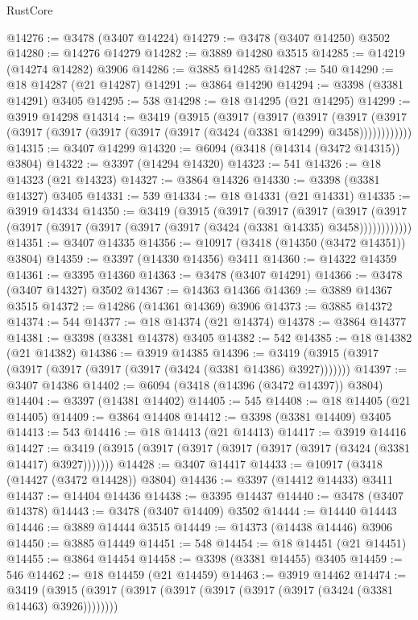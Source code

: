 \begin{lexlean}{RustCore}
\begin{coremodule}
@14276 := @3478 (@3407 @14224)
@14279 := @3478 (@3407 @14250) @3502
@14280 := @14276 @14279
@14282 := @3889 @14280 @3515
@14285 := @14219 (@14274 @14282) @3906
@14286 := @3885 @14285
@14287 := 540
@14290 := @18 @14287 (@21 @14287)
@14291 := @3864 @14290
@14294 := @3398 (@3381 @14291) @3405
@14295 := 538
@14298 := @18 @14295 (@21 @14295)
@14299 := @3919 @14298
@14314 := @3419
    (@3915
      (@3917
        (@3917
          (@3917
            (@3917 (@3917 (@3917 (@3917 (@3917 (@3917 (@3917 (@3424 (@3381 @14299) @3458))))))))))))
@14315 := @3407 @14299
@14320 := @6094 (@3418 (@14314 (@3472 @14315)) @3804)
@14322 := @3397 (@14294 @14320)
@14323 := 541
@14326 := @18 @14323 (@21 @14323)
@14327 := @3864 @14326
@14330 := @3398 (@3381 @14327) @3405
@14331 := 539
@14334 := @18 @14331 (@21 @14331)
@14335 := @3919 @14334
@14350 := @3419
    (@3915
      (@3917
        (@3917
          (@3917
            (@3917 (@3917 (@3917 (@3917 (@3917 (@3917 (@3917 (@3424 (@3381 @14335) @3458))))))))))))
@14351 := @3407 @14335
@14356 := @10917 (@3418 (@14350 (@3472 @14351)) @3804)
@14359 := @3397 (@14330 @14356) @3411
@14360 := @14322 @14359
@14361 := @3395 @14360
@14363 := @3478 (@3407 @14291)
@14366 := @3478 (@3407 @14327) @3502
@14367 := @14363 @14366
@14369 := @3889 @14367 @3515
@14372 := @14286 (@14361 @14369) @3906
@14373 := @3885 @14372
@14374 := 544
@14377 := @18 @14374 (@21 @14374)
@14378 := @3864 @14377
@14381 := @3398 (@3381 @14378) @3405
@14382 := 542
@14385 := @18 @14382 (@21 @14382)
@14386 := @3919 @14385
@14396 := @3419 (@3915 (@3917 (@3917 (@3917 (@3917 (@3917 (@3424 (@3381 @14386) @3927)))))))
@14397 := @3407 @14386
@14402 := @6094 (@3418 (@14396 (@3472 @14397)) @3804)
@14404 := @3397 (@14381 @14402)
@14405 := 545
@14408 := @18 @14405 (@21 @14405)
@14409 := @3864 @14408
@14412 := @3398 (@3381 @14409) @3405
@14413 := 543
@14416 := @18 @14413 (@21 @14413)
@14417 := @3919 @14416
@14427 := @3419 (@3915 (@3917 (@3917 (@3917 (@3917 (@3917 (@3424 (@3381 @14417) @3927)))))))
@14428 := @3407 @14417
@14433 := @10917 (@3418 (@14427 (@3472 @14428)) @3804)
@14436 := @3397 (@14412 @14433) @3411
@14437 := @14404 @14436
@14438 := @3395 @14437
@14440 := @3478 (@3407 @14378)
@14443 := @3478 (@3407 @14409) @3502
@14444 := @14440 @14443
@14446 := @3889 @14444 @3515
@14449 := @14373 (@14438 @14446) @3906
@14450 := @3885 @14449
@14451 := 548
@14454 := @18 @14451 (@21 @14451)
@14455 := @3864 @14454
@14458 := @3398 (@3381 @14455) @3405
@14459 := 546
@14462 := @18 @14459 (@21 @14459)
@14463 := @3919 @14462
@14474 := @3419 (@3915 (@3917 (@3917 (@3917 (@3917 (@3917 (@3917 (@3424 (@3381 @14463) @3926))))))))

\end{coremodule}
\end{lexlean}
